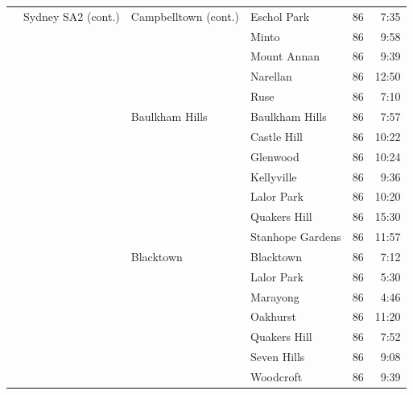 \documentclass{grattan}
\begin{document}
\begin{longtable}{Nlllrr}
 & Sydney SA2 (cont.)             & Campbelltown (cont.)  & Eschol Park          & 86  & 7:35 \\
 &                                &                       & Minto                & 86  & 9:58 \\
 &                                &                       & Mount Annan          & 86  & 9:39 \\
 &                                &                       & Narellan             & 86  & 12:50 \\
 &                                &                       & Ruse                 & 86  & 7:10 \\
 &                                & Baulkham Hills        & Baulkham Hills       & 86  & 7:57 \\
 &                                &                       & Castle Hill          & 86  & 10:22 \\
 &                                &                       & Glenwood             & 86  & 10:24 \\
 &                                &                       & Kellyville           & 86  & 9:36 \\
 &                                &                       & Lalor Park           & 86  & 10:20 \\
 &                                &                       & Quakers Hill         & 86  & 15:30 \\
 &                                &                       & Stanhope Gardens     & 86  & 11:57 \\
 &                                & Blacktown             & Blacktown            & 86  & 7:12 \\
 &                                &                       & Lalor Park           & 86  & 5:30 \\
 &                                &                       & Marayong             & 86  & 4:46 \\
 &                                &                       & Oakhurst             & 86  & 11:20 \\
 &                                &                       & Quakers Hill         & 86  & 7:52 \\
 &                                &                       & Seven Hills          & 86  & 9:08 \\
 &                                &                       & Woodcroft            & 86  & 9:39 \\

\end{longtable}
\end{document}
